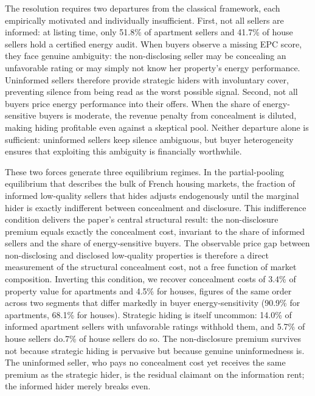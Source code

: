 \documentclass[10pt,letterpaper]{bp-template-concise}
\begin{document}
The resolution requires two departures from the classical framework, each empirically motivated and individually insufficient. First, not all sellers are informed: at listing time, only 51.8\% of apartment sellers and 41.7\% of house sellers hold a certified energy audit. When buyers observe a missing EPC score, they face genuine ambiguity: the non-disclosing seller may be concealing an unfavorable rating or may simply not know her property's energy performance. Uninformed sellers therefore provide strategic hiders with involuntary cover, preventing silence from being read as the worst possible signal. Second, not all buyers price energy performance into their offers. When the share of energy-sensitive buyers is moderate, the revenue penalty from concealment is diluted, making hiding profitable even against a skeptical pool. Neither departure alone is sufficient: uninformed sellers keep silence ambiguous, but buyer heterogeneity ensures that exploiting this ambiguity is financially worthwhile.

These two forces generate three equilibrium regimes. In the partial-pooling equilibrium that describes the bulk of French housing markets, the fraction of informed low-quality sellers that hides adjusts endogenously until the marginal hider is exactly indifferent between concealment and disclosure. This indifference condition delivers the paper's central structural result: the non-disclosure premium equals exactly the concealment cost, invariant to the share of informed sellers and the share of energy-sensitive buyers. The observable price gap between non-disclosing and disclosed low-quality properties is therefore a direct measurement of the structural concealment cost, not a free function of market composition. Inverting this condition, we recover concealment costs of 3.4\% of property value for apartments and 4.5\% for houses, figures of the same order across two segments that differ markedly in buyer energy-sensitivity (90.9\% for apartments, 68.1\% for houses). Strategic hiding is itself uncommon: 14.0\% of informed apartment sellers with unfavorable ratings withhold them, and 5.7\% of house sellers do.7\% of house sellers do so. The non-disclosure premium survives not because strategic hiding is pervasive but because genuine uninformedness is. The uninformed seller, who pays no concealment cost yet receives the same premium as the strategic hider, is the residual claimant on the information rent; the informed hider merely breaks even.
\end{document}
